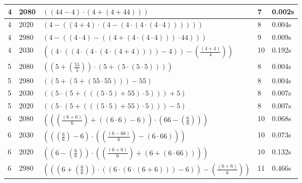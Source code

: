 \documentclass{article}
\theoremstyle{nonumberplain}
\begin{document}
\begin{center}
\begin{longtable}{ | l | l | p{9.5cm} | l | l | }
        4 & 2080 & \( \left(\left(44 - 4\right) \cdot \left(4 + \left(4 + 44\right)\right)\right) \) & 7 & 0.002s \\\hline
        4 & 2020 & \( \left(4 - \left(\left(4 + 4\right) \cdot \left(4 - \left(4 \cdot \left(4 \cdot \left(4 \cdot 4\right)\right)\right)\right)\right)\right) \) & 8 & 0.004s \\\hline
        4 & 2980 & \( \left(4 - \left(\left(4 \cdot 4\right) - \left(\left(4 + \left(4 \cdot \left(4 \cdot 4\right)\right)\right) \cdot 44\right)\right)\right) \) & 9 & 0.009s \\\hline
        4 & 2030 & \( \left(\left(4 \cdot \left(\left(4 \cdot \left(4 \cdot \left(4 \cdot \left(4 + 4\right)\right)\right)\right) - 4\right)\right) - \left(\frac{\left(4 + 4\right)}{4}\right)\right) \) & 10 & 0.192s \\\hline
        5 & 2080 & \( \left(\left(5 + \left(\frac{55}{5}\right)\right) \cdot \left(5 + \left(5 \cdot \left(5 \cdot 5\right)\right)\right)\right) \) & 8 & 0.004s \\\hline
        5 & 2980 & \( \left(\left(5 + \left(5 + \left(55 \cdot 55\right)\right)\right) - 55\right) \) & 8 & 0.004s \\\hline
        5 & 2030 & \( \left(\left(5 \cdot \left(5 + \left(\left(\left(5 \cdot 5\right) + 55\right) \cdot 5\right)\right)\right) + 5\right) \) & 8 & 0.007s \\\hline
        5 & 2020 & \( \left(\left(5 \cdot \left(5 + \left(\left(\left(5 \cdot 5\right) + 55\right) \cdot 5\right)\right)\right) - 5\right) \) & 8 & 0.007s \\\hline
        6 & 2080 & \( \left(\left(\left(\frac{\left(6 + 6\right)}{6}\right) + \left(\left(6 \cdot 6\right) - 6\right)\right) \cdot \left(66 - \left(\frac{6}{6}\right)\right)\right) \) & 10 & 0.068s \\\hline
        6 & 2030 & \( \left(\left(\left(\frac{6}{6}\right) - 6\right) \cdot \left(\left(\frac{\left(6 - 66\right)}{6}\right) - \left(6 \cdot 66\right)\right)\right) \) & 10 & 0.073s \\\hline
        6 & 2020 & \( \left(\left(6 - \left(\frac{6}{6}\right)\right) \cdot \left(\left(\frac{\left(6 + 6\right)}{6}\right) + \left(6 + \left(6 \cdot 66\right)\right)\right)\right) \) & 10 & 0.132s \\\hline
        6 & 2980 & \( \left(\left(\left(6 + \left(\frac{6}{6}\right)\right) \cdot \left(\left(6 \cdot \left(6 \cdot \left(6 + 6\right)\right)\right) - 6\right)\right) - \left(\frac{\left(6 + 6\right)}{6}\right)\right) \) & 11 & 0.466s \\\hline

\end{longtable}
\end{center}
\end{document}
